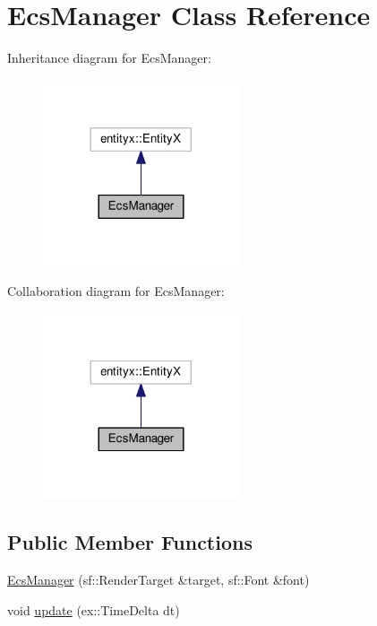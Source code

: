 \hypertarget{classEcsManager}{}\section{Ecs\+Manager Class Reference}
\label{classEcsManager}


Inheritance diagram for Ecs\+Manager\+:\nopagebreak
\begin{figure}[H]
\begin{center}
\leavevmode
\includegraphics[width=164pt]{classEcsManager__inherit__graph}
\end{center}
\end{figure}


Collaboration diagram for Ecs\+Manager\+:\nopagebreak
\begin{figure}[H]
\begin{center}
\leavevmode
\includegraphics[width=164pt]{classEcsManager__coll__graph}
\end{center}
\end{figure}
\subsection*{Public Member Functions}
\begin{DoxyCompactItemize}
\item 
\hyperlink{classEcsManager_aa34cfb8983951b281bcfc59e9625f9a0}{Ecs\+Manager} (sf\+::\+Render\+Target \&target, sf\+::\+Font \&font)
\item 
void \hyperlink{classEcsManager_a28fa50f9ab6b01f06dd9cfb6f7d7a1b7}{update} (ex\+::\+Time\+Delta dt)
\end{DoxyCompactItemize}


